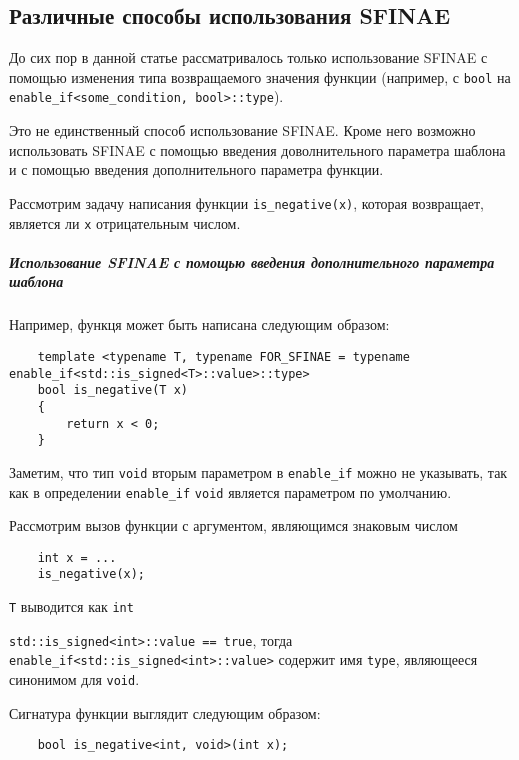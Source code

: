 \subsection{Различные способы использования SFINAE}

	До сих пор в данной статье рассматривалось только использование SFINAE с помощью изменения типа возвращаемого значения функции (например, с \texttt{bool} на \texttt{enable_if<some_condition, bool>::type}).
	
	Это не единственный способ использование SFINAE. Кроме него возможно использовать SFINAE с помощью введения доволнительного параметра шаблона и с помощью введения дополнительного параметра функции.
	
	Рассмотрим задачу написания функции \texttt{is_negative(x)}, которая возвращает, является ли \texttt{x} отрицательным числом.
	
\subparagraph{Использование SFINAE с помощью введения дополнительного параметра шаблона}

	Например, функця может быть написана следующим образом:
	
	\begin{verbatim}
	template <typename T, typename FOR_SFINAE = typename enable_if<std::is_signed<T>::value>::type>
	bool is_negative(T x)
	{
		return x < 0;
	}
	\end{verbatim}
	
	Заметим, что тип \texttt{void} вторым параметром в \texttt{enable_if} можно не указывать, так как в определении \texttt{enable_if} \texttt{void} является параметром по умолчанию.
	
	Рассмотрим вызов функции с аргументом, являющимся знаковым числом
	
	\begin{verbatim}
	int x = ...
	is_negative(x);
	\end{verbatim}
	
	\texttt{T} выводится как \texttt{int}
	
	\texttt{std::is_signed<int>::value == true}, тогда \texttt{enable_if<std::is_signed<int>::value>} содержит имя \texttt{type}, являющееся синонимом для \texttt{void}.
	
	Сигнатура функции выглядит следующим образом:
	
	\begin{verbatim}
	bool is_negative<int, void>(int x);
	\end{verbatim}
	
